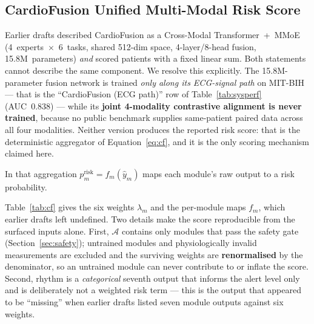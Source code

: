 \documentclass[AMA,STIX1COL,]{WileyNJD-v2}
\begin{document}
\subsection{CardioFusion Unified Multi-Modal Risk Score}

Earlier drafts described CardioFusion as a Cross-Modal
Transformer~+~MMoE (4~experts~$\times$~6~tasks, shared 512-dim space,
4-layer/8-head fusion, 15.8M~parameters) \emph{and} scored patients
with a fixed linear sum. Both statements cannot describe the same
component. We resolve this explicitly. The 15.8M-parameter fusion
network is trained \emph{only along its ECG-signal path} on MIT-BIH ---
that is the ``CardioFusion (ECG path)'' row of
Table~\ref{tab:sysperf} (AUC~0.838) --- while its \textbf{joint
4-modality contrastive alignment is never trained}, because no public
benchmark supplies same-patient paired data across all four modalities.
Neither version produces the reported risk score: that is the
deterministic aggregator of Equation~\ref{eq:cf}, and it is the only
scoring mechanism claimed here.

\noindent In that aggregation $p_m^{\mathrm{risk}} = f_m(\hat{y}_m)$ maps each
module's raw output to a risk probability.

\noindent Table~\ref{tab:cf} gives the six weights $\lambda_m$ and the
per-module maps $f_m$, which earlier drafts left undefined. Two
details make the score reproducible from the surfaced inputs alone.
First, $\mathcal{A}$ contains only modules that pass
the safety gate (Section~\ref{sec:safety}); untrained modules and
physiologically invalid measurements are excluded and the surviving
weights are \textbf{renormalised} by the denominator, so an untrained
module can never contribute to or inflate the score. Second, rhythm is
a \emph{categorical} seventh output that informs the alert level only
and is deliberately not a weighted risk term --- this is the output
that appeared to be ``missing'' when earlier drafts listed seven
module outputs against six weights.
\end{document}
